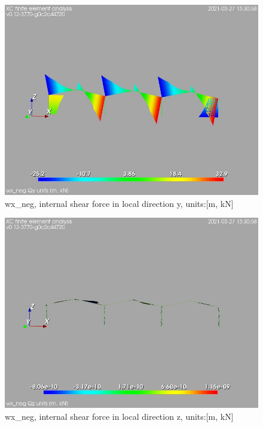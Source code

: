 \begin{figure}
\begin{center}
\includegraphics[width=\linewidth]{calc_results/sole_zeinali/text/graphics/resSimplLC/wx_negallMemberSetQy}
\caption{wx_neg, internal shear force in local direction y, units:[m, kN]}
\end{center}
\end{figure}
\begin{figure}
\begin{center}
\includegraphics[width=\linewidth]{calc_results/sole_zeinali/text/graphics/resSimplLC/wx_negallMemberSetQz}
\caption{wx_neg, internal shear force in local direction z, units:[m, kN]}
\end{center}
\end{figure}
